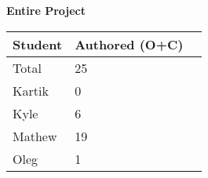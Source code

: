 \documentclass{article}
\begin{document}
    \begin{table}[H]
        \centering
        \textbf{Entire Project}\\
        \begin{tabular}{lll}
        \toprule
        \textbf{Student} & \textbf{Authored (O+C)}\\
        \midrule
        Total & 25\\
        Kartik & 0\\
        Kyle   & 6 \\
        Mathew & 19 \\
        Oleg   & 1 \\
        
        \bottomrule
        \end{tabular}
        \end{table}
\end{document}
